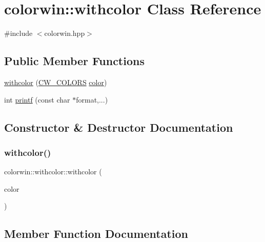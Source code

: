 \hypertarget{classcolorwin_1_1withcolor}{}\section{colorwin\+:\+:withcolor Class Reference}
\label{classcolorwin_1_1withcolor}


{\ttfamily \#include $<$colorwin.\+hpp$>$}

\subsection*{Public Member Functions}
\begin{DoxyCompactItemize}
\item 
\hyperlink{classcolorwin_1_1withcolor_ada703091b2d32414707019ba19fd6264}{withcolor} (\hyperlink{namespacecolorwin_a9c26d66eac71ba049d125e59a63e95d4}{C\+W\+\_\+\+C\+O\+L\+O\+RS} \hyperlink{classcolorwin_1_1color}{color})
\item 
int \hyperlink{classcolorwin_1_1withcolor_abc2b2a311cf4dbfcd7e8a42f78003071}{printf} (const char $\ast$format,...)
\end{DoxyCompactItemize}


\subsection{Constructor \& Destructor Documentation}
\mbox{\label{classcolorwin_1_1withcolor_ada703091b2d32414707019ba19fd6264}} 
\subsubsection{\texorpdfstring{withcolor()}{withcolor()}}
{\footnotesize\ttfamily colorwin\+::withcolor\+::withcolor (\begin{DoxyParamCaption}\item[{\hyperlink{namespacecolorwin_a9c26d66eac71ba049d125e59a63e95d4}{C\+W\+\_\+\+C\+O\+L\+O\+RS}}]{color }\end{DoxyParamCaption})\hspace{0.3cm}{\ttfamily [inline]}}



\subsection{Member Function Documentation}
\mbox{\label{classcolorwin_1_1withcolor_abc2b2a311cf4dbfcd7e8a42f78003071}} 
